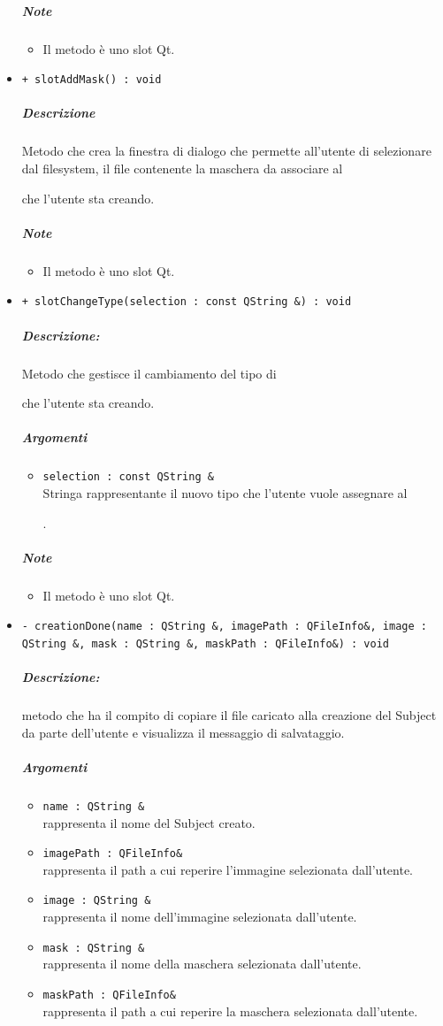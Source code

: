 \begin{itemize}
			\subparagraph{Note}
			\begin{itemize}
				\item Il metodo è uno slot\g{} Qt\g{}.
			\end{itemize}
			\item \color{blue} \verb!+ slotAddMask() : void!
			\color{black}
			\subparagraph{Descrizione} Metodo che crea la finestra di dialogo che permette all'utente di selezionare dal filesystem, il file contenente la maschera da associare al \subject{} che l'utente sta creando.
			\subparagraph{Note}
			\begin{itemize}
				\item Il metodo è uno slot\g{} Qt\g{}.
			\end{itemize}
			\item \color{blue} \verb!+ slotChangeType(selection : const QString &) : void!
			\color{black}
			\subparagraph{Descrizione:} Metodo che gestisce il cambiamento del tipo di \subject{} che l'utente sta creando.
			\color{black}
			\subparagraph{Argomenti}
			\begin{itemize}
				\item \color{RoyalPurple} \verb!selection : const QString &!\\				
\color{black} Stringa rappresentante il nuovo tipo che l'utente vuole assegnare al \subject{}.
			\end{itemize}
			\subparagraph{Note}
			\begin{itemize}
				\item Il metodo è uno slot\g{} Qt\g{}.
			\end{itemize}
			\item \color{blue} \verb!- creationDone(name : QString &, imagePath : QFileInfo&, image : QString &, mask : QString &, maskPath : QFileInfo&) : void!
			\color{black}
			\subparagraph{Descrizione:} metodo che ha il compito di copiare il file caricato alla creazione del Subject\g{} da parte dell'utente e visualizza il messaggio di salvataggio.
			\color{black}
			\subparagraph{Argomenti}
			\begin{itemize}
				\item \color{RoyalPurple} \verb!name : QString &!\\				
\color{black} rappresenta il nome del Subject\g{} creato.
				\item \color{RoyalPurple} \verb!imagePath : QFileInfo&!\\				
\color{black} rappresenta il path a cui reperire l'immagine selezionata dall'utente\g{}.
				\item \color{RoyalPurple} \verb!image : QString &!\\				
\color{black} rappresenta il nome dell'immagine selezionata dall'utente.
				\item \color{RoyalPurple} \verb!mask : QString &!\\				
\color{black} rappresenta il nome della maschera selezionata dall'utente.
				\item \color{RoyalPurple} \verb!maskPath : QFileInfo&!\\				
\color{black} rappresenta il path a cui reperire la maschera selezionata dall'utente.
			\end{itemize}
		\end{itemize}
		\pagebreak
